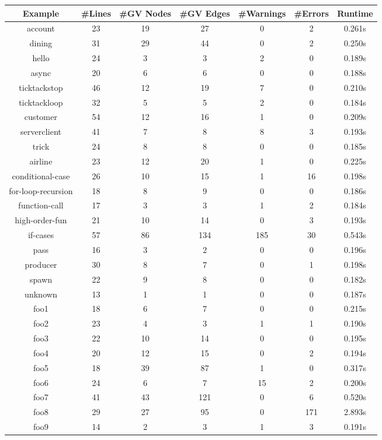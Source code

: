 \begin{table}[h]
\centering
\begin{tabular}{|c|c|c|c|c|c|c|}
\hline
Example & #Lines & #GV Nodes & #GV Edges & #Warnings & #Errors & Runtime \\ 
\hline
account & 23 & 19 & 27 & 0 & 2 & 0.261s \\ 
dining & 31 & 29 & 44 & 0 & 2 & 0.250s \\ 
hello & 24 & 3 & 3 & 2 & 0 & 0.189s \\ 
async & 20 & 6 & 6 & 0 & 0 & 0.188s \\ 
ticktackstop & 46 & 12 & 19 & 7 & 0 & 0.210s \\ 
ticktackloop & 32 & 5 & 5 & 2 & 0 & 0.184s \\ 
customer & 54 & 12 & 16 & 1 & 0 & 0.209s \\ 
serverclient & 41 & 7 & 8 & 8 & 3 & 0.193s \\ 
trick & 24 & 8 & 8 & 0 & 0 & 0.185s \\ 
airline & 23 & 12 & 20 & 1 & 0 & 0.225s \\ 
conditional-case & 26 & 10 & 15 & 1 & 16 & 0.198s \\ 
for-loop-recursion & 18 & 8 & 9 & 0 & 0 & 0.186s \\ 
function-call & 17 & 3 & 3 & 1 & 2 & 0.184s \\ 
high-order-fun & 21 & 10 & 14 & 0 & 3 & 0.193s \\ 
if-cases & 57 & 86 & 134 & 185 & 30 & 0.543s \\ 
pass & 16 & 3 & 2 & 0 & 0 & 0.196s \\ 
producer & 30 & 8 & 7 & 0 & 1 & 0.198s \\ 
spawn & 22 & 9 & 8 & 0 & 0 & 0.182s \\ 
unknown & 13 & 1 & 1 & 0 & 0 & 0.187s \\ 
foo1 & 18 & 6 & 7 & 0 & 0 & 0.215s \\ 
foo2 & 23 & 4 & 3 & 1 & 1 & 0.190s \\ 
foo3 & 22 & 10 & 14 & 0 & 0 & 0.195s \\ 
foo4 & 20 & 12 & 15 & 0 & 2 & 0.194s \\ 
foo5 & 18 & 39 & 87 & 1 & 0 & 0.317s \\ 
foo6 & 24 & 6 & 7 & 15 & 2 & 0.200s \\ 
foo7 & 41 & 43 & 121 & 0 & 6 & 0.520s \\ 
foo8 & 29 & 27 & 95 & 0 & 171 & 2.893s \\ 
foo9 & 14 & 2 & 3 & 1 & 3 & 0.191s \\ 

\end{tabular}
\end{table}
